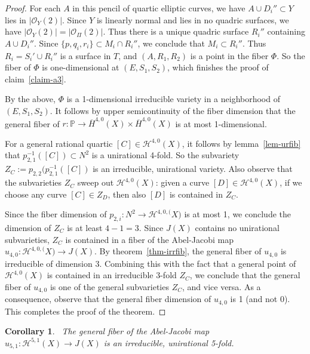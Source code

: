\documentclass[amssymb,twoside,12 pt,amscd,reqno]{amsart}
\theoremstyle{plain}
\newtheorem{cor}[thm]{Corollary}
\theoremstyle{definition}
\newcommand{\Hdg}[2]{\mathcal{H}^{#1,#2}}
\newcommand{\PP}{\mathbb{P}}
\def\ps{\vspace{4pt}}
\newcommand{\OO}{\mathcal O}
\begin{document}
\begin{proof}
\ps

For each $A$ in this pencil of quartic elliptic curves, we have $A\cup
D_i''\subset Y$ lies in $|\OO_Y(2)|$.  Since $Y$ is linearly normal
and lies in no quadric surfaces, we have $|\OO_Y(2)|=|\OO_{\Pi}(2)|$.
Thus there is a unique quadric surface $R_i''$ containing $A\cup
D_i''$.  Since $\{p,q_i,r_i\}\subset M_i\cap R_i''$, we conclude that
$M_i\subset R_i''$.  Thus $R_i=S_i'\cup R_i''$ is a surface in $T$,
and $(A,R_1,R_2)$ is a point in the fiber $\Phi$.  So the fiber of
$\Phi$ is one-dimensional at $(E,S_1,S_2)$, which finishes the proof
of claim~\ref{claim-a3}.  

\ps

By the above, $\Phi$ is a 1-dimensional irreducible variety in a
neighborhood of $(E,S_1,S_2)$.  It follows by upper semicontinuity of
the fiber dimension that the general fiber of $r:\PP
\rightarrow \overline{H}^{4,0}(X)\times \overline{H}^{4,0}(X)$ is at most
1-dimensional.  

\ps

For a general rational quartic $[C]\in\Hdg{4}{0}(X)$, it follows by
lemma~\ref{lem-urfib} that $p_{2,1}^{-1}([C])\subset N^2$ is a
unirational 4-fold.  So the subvariety
$Z_C:=p_{2,2}(p_{2,1}^{-1}([C])$ is an irreducible, unirational
variety.  Also observe that the subvarieties $Z_C$ sweep out
$\Hdg{4}{0}(X)$: given a curve $[D]\in\Hdg{4}{0}(X)$, if we choose any 
curve $[C]\in Z_D$, then also $[D]$ is contained in $Z_C$.  

\ps

Since the fiber dimension of $p_{2,i}:N^2\rightarrow \Hdg{4,0}(X)$ is
at most 1, we conclude the dimension of $Z_C$ is at least $4-1=3$.
Since $J(X)$ 
contains no unirational subvarieties, $Z_C$ is
contained in a fiber of the Abel-Jacobi map
$u_{4,0}:\Hdg{4,0}(X)\rightarrow J(X)$.  By theorem~\ref{thm-irrfib},
the general fiber of $u_{4,0}$ is irreducible of dimension $3$.
Combining this with the fact that a general point of
$\Hdg{4}{0}(X)$ is contained in an irreducible 3-fold $Z_C$, we
conclude that the general fiber of $u_{4,0}$ is one of the general
subvarieties $Z_C$, and vice versa.  As a consequence, observe that
the general fiber dimension of $u_{4,0}$ is 1 (and not 0).  This
completes the proof of the theorem.
\end{proof}

\ps

\begin{cor}~\label{cor-51fib}  The general fiber of the Abel-Jacobi
map
$u_{5,1}:\Hdg{5}{1}(X)\rightarrow J(X)$ is an irreducible, unirational
5-fold.
\end{cor}
\end{document}
